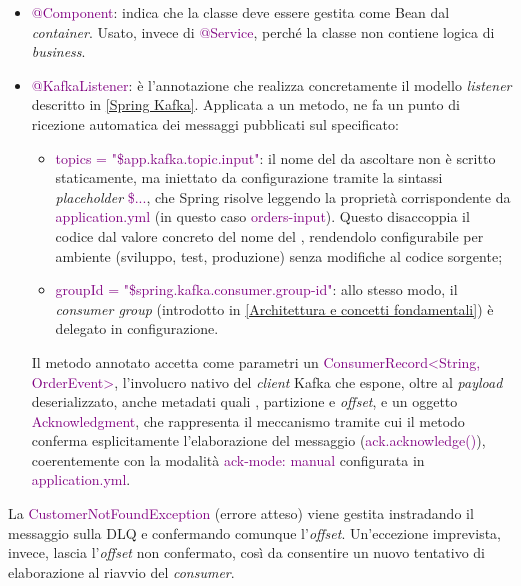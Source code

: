 \begin{itemize}
    \item \textcolor{purple}{@Component}: indica che la classe deve essere gestita come \gls{Bean} dal \textit{container}. Usato, invece di \textcolor{purple}{@Service}, perché la classe non contiene logica di \textit{business}.
    \newpage
    \item \textcolor{purple}{@KafkaListener}: è l'annotazione che realizza concretamente il modello \textit{listener} descritto in \ref{Spring Kafka}. Applicata a un metodo, ne fa un punto di ricezione automatica dei messaggi pubblicati sul \textit{} specificato:
    \begin{itemize}
        \item \textcolor{purple}{topics = "\${app.kafka.topic.input}"}: il nome del \textit{} da ascoltare non è scritto staticamente, ma iniettato da configurazione tramite la sintassi \textit{placeholder} \textcolor{purple}{\${...}}, che Spring risolve leggendo la proprietà corrispondente da \textcolor{purple}{application.yml} (in questo caso \textcolor{purple}{orders-input}). Questo disaccoppia il codice dal valore concreto del nome del \textit{}, rendendolo configurabile per ambiente (sviluppo, test, produzione) senza modifiche al codice sorgente;
        \item \textcolor{purple}{groupId = "\${spring.kafka.consumer.group-id}"}: allo stesso modo, il \textit{consumer group} (introdotto in \ref{Architettura e concetti fondamentali}) è delegato in configurazione.
    \end{itemize}
    Il metodo annotato accetta come parametri un \textcolor{purple}{ConsumerRecord<String, OrderEvent>}, l'involucro nativo del \textit{client} Kafka che espone, oltre al \textit{payload} deserializzato, anche metadati quali \textit{}, partizione e \textit{offset}, e un oggetto \textcolor{purple}{Acknowledgment}, che rappresenta il meccanismo tramite cui il metodo conferma esplicitamente l'elaborazione del messaggio (\textcolor{purple}{ack.acknowledge()}), coerentemente con la modalità \textcolor{purple}{ack-mode: manual} configurata in \textcolor{purple}{application.yml}.
\end{itemize}
La \textcolor{purple}{CustomerNotFoundException} (errore atteso) viene gestita instradando il messaggio sulla \acrshort{DLQ} e confermando comunque l'\textit{offset}.
Un'eccezione imprevista, invece, lascia l'\textit{offset} non confermato, così da consentire un nuovo tentativo di elaborazione al riavvio del \textit{consumer}.

